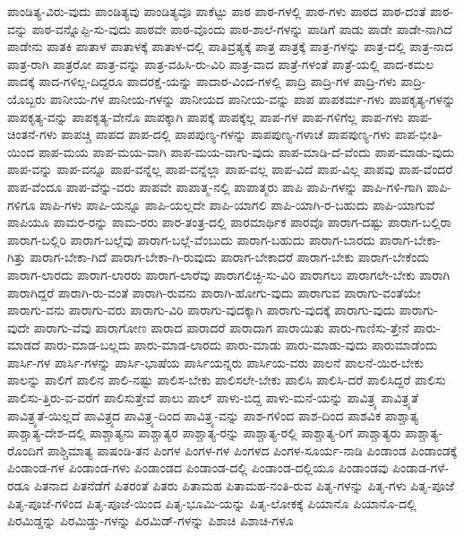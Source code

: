 {ಪಾಂಡಿತ್ಯ-ವಿರು-ವುದು
ಪಾಂಡಿತ್ಯವು
ಪಾಂಡಿತ್ಯವೂ
ಪಾಕೆಟ್ಟು
ಪಾಠ
ಪಾಠ-ಗಳಲ್ಲಿ
ಪಾಠ-ಗಳು
ಪಾಠದ
ಪಾಠ-ದಂತೆ
ಪಾಠ-ವನ್ನು
ಪಾಠ-ವನ್ನೊಪ್ಪಿ-ಸು-ವುದು
ಪಾಠವೇ
ಪಾಠ-ವೊಂದು
ಪಾಠ-ಶಾಲೆ-ಗಳನ್ನು
ಪಾಡಿಗೆ
ಪಾಡು
ಪಾಡೇ
ಪಾಡೇ-ನಾಗಿದೆ
ಪಾಡೇನು
ಪಾತಕಿ
ಪಾತಾಳ
ಪಾತಾಳಕ್ಕೆ
ಪಾತಾಳ-ದಲ್ಲಿ
ಪಾತಿವ್ರತ್ಯಕ್ಕೆ
ಪಾತ್ರ
ಪಾತ್ರಕ್ಕೆ
ಪಾತ್ರ-ಗಳನ್ನು
ಪಾತ್ರ-ದಲ್ಲಿ
ಪಾತ್ರ-ನಾದ
ಪಾತ್ರ-ರಾಗಿ
ಪಾತ್ರರೋ
ಪಾತ್ರ-ವನ್ನು
ಪಾತ್ರ-ವಹಿಸಿ-ರು-ವಿರಿ
ಪಾತ್ರ-ವಾದ
ಪಾತ್ರೆ-ಗಳಂತೆ
ಪಾತ್ರೆ-ಯಲ್ಲಿ
ಪಾದ-ಕಮಲ
ಪಾದಕ್ಕೆ
ಪಾದ-ಗಳಿಲ್ಲ-ದಿದ್ದರೂ
ಪಾದರಕ್ಷೆ-ಯನ್ನು
ಪಾದಾರ-ವಿಂದ-ಗಳಲ್ಲಿ
ಪಾದ್ರಿ
ಪಾದ್ರಿ-ಗಳ
ಪಾದ್ರಿ-ಗಳು
ಪಾದ್ರಿ-ಯೊಬ್ಬರು
ಪಾನೀಯ-ಗಳ
ಪಾನೀಯ-ಗಳನ್ನು
ಪಾನೀಯದ
ಪಾನೀಯ-ವನ್ನು
ಪಾಪ
ಪಾಪಕರ್ಮ-ಗಳು
ಪಾಪಕೃತ್ಯ-ಗಳನ್ನು
ಪಾಪಕೃತ್ಯ-ವನ್ನು
ಪಾಪಕೃತ್ಯ-ವೇನೊ
ಪಾಪಕ್ಕಾಗಿ
ಪಾಪಕ್ಕೆ
ಪಾಪಕ್ಕೆಲ್ಲ
ಪಾಪ-ಗಳ
ಪಾಪ-ಗಳಿಗೆಲ್ಲ
ಪಾಪ-ಗಳು
ಪಾಪ-ಚಿಂತನೆ-ಗಳು
ಪಾಪಚ್ಚಿ
ಪಾಪದ
ಪಾಪ-ದಲ್ಲಿ
ಪಾಪಪುಣ್ಯ-ಗಳನ್ನು
ಪಾಪಪುಣ್ಯ-ಗಳಾಚೆ
ಪಾಪಪುಣ್ಯ-ಗಳು
ಪಾಪ-ಭೀತಿ-ಯಿಂದ
ಪಾಪ-ಮಯ
ಪಾಪ-ಮಯ-ವಾಗಿ
ಪಾಪ-ಮಯ-ವಾಗು-ವುದು
ಪಾಪ-ಮಾಡಿ-ದೆ-ವೆಂದು
ಪಾಪ-ಮಾಡು-ವುದು
ಪಾಪ-ವನ್ನು
ಪಾಪ-ವನ್ನೂ
ಪಾಪ-ವನ್ನೆಲ್ಲ
ಪಾಪ-ವನ್ನೆಲ್ಲಾ
ಪಾಪ-ವಲ್ಲ
ಪಾಪ-ವಿದೆ
ಪಾಪ-ವಿಲ್ಲ
ಪಾಪವು
ಪಾಪ-ವೆಂದರೆ
ಪಾಪ-ವೆಂದೂ
ಪಾಪ-ವೆನ್ನು-ವರು
ಪಾಪವೇ
ಪಾಪಾತ್ಮ-ನಲ್ಲಿ
ಪಾಪಾತ್ಮರು
ಪಾಪಿ
ಪಾಪಿ-ಗಳನ್ನು
ಪಾಪಿ-ಗಳಿ-ಗಾಗಿ
ಪಾಪಿ-ಗಳಿಗೂ
ಪಾಪಿ-ಗಳು
ಪಾಪಿ-ಯನ್ನೂ
ಪಾಪಿ-ಯಲ್ಲದೇ
ಪಾಪಿ-ಯಾಗಲಿ
ಪಾಪಿ-ಯಾಗಿ-ರ-ಬಹುದು
ಪಾಪಿ-ಯಾಗುವೆ
ಪಾಪಿಯೂ
ಪಾಮರ-ರನ್ನು
ಪಾಮ-ರರು
ಪಾರ-ತಂತ್ರ-ದಲ್ಲಿ
ಪಾರಮಾರ್ಥಿಕ
ಪಾರವೊ
ಪಾರಾಗ-ದಷ್ಟು
ಪಾರಾಗ-ಬಲ್ಲಿರಾ
ಪಾರಾಗ-ಬಲ್ಲಿರಿ
ಪಾರಾಗ-ಬಲ್ಲೆವು
ಪಾರಾಗ-ಬಲ್ಲೆ-ವೆಂಬುದು
ಪಾರಾಗ-ಬಹುದು
ಪಾರಾಗ-ಬಾರದು
ಪಾರಾಗ-ಬೇಕಾ-ಗಿತ್ತು
ಪಾರಾಗ-ಬೇಕಾ-ಗಿದೆ
ಪಾರಾಗ-ಬೇಕಾ-ಗಿ-ರುವುದು
ಪಾರಾಗ-ಬೇಕಾದರೆ
ಪಾರಾಗ-ಬೇಕು
ಪಾರಾಗ-ಬೇಕೆಂದು
ಪಾರಾಗ-ಲಾರದು
ಪಾರಾಗ-ಲಾರರು
ಪಾರಾಗ-ಲಾರೆವು
ಪಾರಾಗಲಿಚ್ಛಿ-ಸು-ವಿರಿ
ಪಾರಾಗಲು
ಪಾರಾಗಲೇ-ಬೇಕು
ಪಾರಾಗಿ
ಪಾರಾಗಿದ್ದರೆ
ಪಾರಾಗಿ-ರು-ವಂತೆ
ಪಾರಾಗಿ-ರುವನು
ಪಾರಾಗಿ-ಹೋಗು-ವುದು
ಪಾರಾಗುವ
ಪಾರಾಗು-ವಂತೆಯೇ
ಪಾರಾಗು-ವನು
ಪಾರಾಗು-ವರು
ಪಾರಾಗು-ವಿರಿ
ಪಾರಾಗು-ವುದಕ್ಕಾಗಿ
ಪಾರಾಗು-ವುದಕ್ಕೆ
ಪಾರಾಗು-ವುದು
ಪಾರಾಗು-ವುದೇ
ಪಾರಾಗು-ವೆವು
ಪಾರಾಗೋಣ
ಪಾರಾದ
ಪಾರಾದರೆ
ಪಾರಾದಾಗ
ಪಾರಾಯಿತು
ಪಾರು-ಗಾಣಿಸು-ತ್ತೇನೆ
ಪಾರು-ಮಾಡದೆ
ಪಾರು-ಮಾಡ-ಬಲ್ಲದು
ಪಾರು-ಮಾಡ-ಲಾರದು
ಪಾರು-ಮಾಡು
ಪಾರು-ಮಾಡು-ವುದು
ಪಾರುಮಾಡೆಂದು
ಪಾರ್ಸಿ-ಗಳ
ಪಾರ್ಸಿ-ಗಳನ್ನು
ಪಾರ್ಸಿ-ಭಾಷೆಯ
ಪಾರ್ಸಿಯನ್ನರು
ಪಾರ್ಸಿಯ-ವರು
ಪಾಲನೆ
ಪಾಲನೆ-ಯಿರ-ಬೇಕು
ಪಾಲನ್ನು
ಪಾಲಿಗೆ
ಪಾಲಿನ
ಪಾಲಿ-ನಷ್ಟು
ಪಾಲಿಸ-ಬೇಕು
ಪಾಲಿಸಲೇ-ಬೇಕು
ಪಾಲಿಸಿ
ಪಾಲಿಸಿ-ದರೆ
ಪಾಲಿಸಿದ್ದರೆ
ಪಾಲಿಸು
ಪಾಲಿಸು-ತ್ತಿರು-ವ-ವರೆಗೆ
ಪಾಲಿಸುತ್ತೇವೆ
ಪಾಲು
ಪಾಲ್
ಪಾಳು-ಬಿದ್ದ
ಪಾಳು-ಮನೆ-ಯನ್ನು
ಪಾವಿತ್ರ್ಯ
ಪಾವಿತ್ರ್ಯತೆ
ಪಾವಿತ್ರ್ಯತೆ-ಯಿಲ್ಲದೆ
ಪಾವಿತ್ರ್ಯದ
ಪಾವಿತ್ರ್ಯ-ದಿಂದ
ಪಾವಿತ್ರ್ಯ-ವನ್ನು
ಪಾಶ-ಗಳಿಂದ
ಪಾಶ-ದಿಂದ
ಪಾಶವಿಕ
ಪಾಶ್ಚಾತ್ಯ
ಪಾಶ್ಚಾತ್ಯ-ದೇಶ-ದಲ್ಲಿ
ಪಾಶ್ಚಾತ್ಯನು
ಪಾಶ್ಚಾತ್ಯರ
ಪಾಶ್ಚಾತ್ಯ-ರನ್ನು
ಪಾಶ್ಚಾತ್ಯ-ರಲ್ಲಿ
ಪಾಶ್ಚಾತ್ಯ-ರಿಗೆ
ಪಾಶ್ಚಾತ್ಯರು
ಪಾಶ್ಚಾತ್ಯ-ರೊಂದಿಗೆ
ಪಾಶ್ಚಿಮಾತ್ಯ
ಪಾಷಂಡಿ-ತನ
ಪಿಂಗಳ
ಪಿಂಗಳ-ಗಳ
ಪಿಂಗಳದ
ಪಿಂಗಳ-ಸೂರ್ಯ-ನಾಡಿ
ಪಿಂಡಾಂಡ
ಪಿಂಡಾಂಡಕ್ಕೆ
ಪಿಂಡಾಂಡ-ಗಳ
ಪಿಂಡಾಂಡ-ಗಳು
ಪಿಂಡಾಂಡದ
ಪಿಂಡಾಂಡ-ದಲ್ಲಿ
ಪಿಂಡಾಂಡ-ದಲ್ಲಿಯೂ
ಪಿಂಡಾಂಡವು
ಪಿಂಡಾಡ-ಗಳೆ-ರಡೂ
ಪಿತನಾದ
ಪಿತನೆಡೆಗೆ
ಪಿತರಂತೆ
ಪಿತರು
ಪಿತಾಮಹ
ಪಿತಾಮಹ-ನಂತಿ-ರುವ
ಪಿತೃ-ಗಳನ್ನು
ಪಿತೃ-ಗಳು
ಪಿತೃ-ಪೂಜೆ
ಪಿತೃ-ಪೂಜೆ-ಗಳಿಂದ
ಪಿತೃ-ಪೂಜೆ-ಯಿಂದ
ಪಿತೃ-ಭೂಮಿ-ಯನ್ನು
ಪಿತೃ-ಲೋಕಕ್ಕೆ
ಪಿಯಾನೊ
ಪಿಯಾನೊ-ದಲ್ಲಿ
ಪಿರಮಿಡ್ಡನ್ನು
ಪಿರಮಿಡ್ಡು-ಗಳನ್ನು
ಪಿರಮಿಡ್-ಗಳನ್ನು
ಪಿಶಾಚಿ
ಪಿಶಾಚಿ-ಗಳೂ
}
